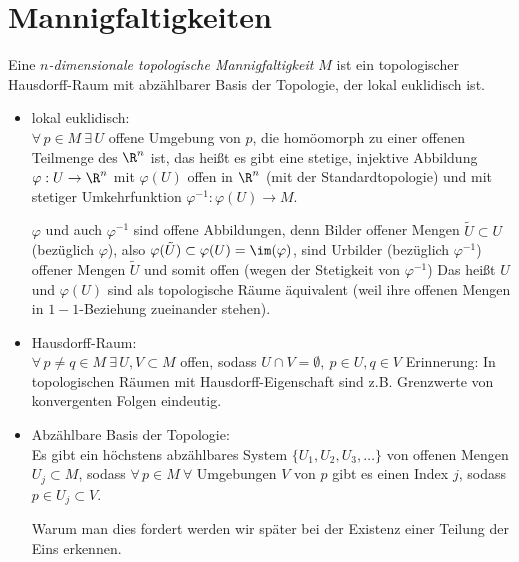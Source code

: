 \chapter{Mannigfaltigkeiten}\lecture

\begin{defn}\label{def1_1}
	Eine \emph{$n$-dimensionale topologische Mannigfaltigkeit $M$} ist ein topologischer Hausdorff-Raum mit abzählbarer Basis der Topologie, der lokal euklidisch ist.
	\begin{itemize}
		\item lokal euklidisch:\\
			$ \forall\, p \in M\ \exists\, U $ offene Umgebung von $p$, die homöomorph zu einer offenen Teilmenge des $\R^n$ ist, das heißt es gibt eine stetige, injektive Abbildung $ \varphi: U \to \R^n $ mit $ \varphi(U) $ offen in $\R^n$ (mit der Standardtopologie) und mit stetiger Umkehrfunktion $\varphi^{-1}: \varphi(U) \to M$.
			\begin{rem*}
				$\varphi$ und auch $\varphi^{-1}$ sind offene Abbildungen, denn Bilder offener Mengen $ \tilde{U} \subset U $ (bezüglich $\varphi$), also $ \varphi(\tilde{U}) \subset \varphi(U) = \im(\varphi) $, sind Urbilder (bezüglich $\varphi^{-1}$) offener Mengen $\tilde{U}$ und somit offen (wegen der Stetigkeit von $\varphi^{-1}$)
				Das heißt $U$ und $\varphi(U)$ sind als topologische Räume äquivalent (weil ihre offenen Mengen in $1-1$-Beziehung zueinander stehen).
			\end{rem*}
		\item Hausdorff-Raum:\\
			$ \forall\, p \neq q \in M \ \exists\, U,V \subset M $ offen, sodass $ U \cap V = \emptyset,\ p \in U, q \in V $
			\image{1_1 hausdorff}{6cm}
			Erinnerung: In topologischen Räumen mit Hausdorff-Eigenschaft sind z.B. Grenzwerte von konvergenten Folgen eindeutig.
		\item Abzählbare Basis der Topologie:\\
			Es gibt ein höchstens abzählbares System $ \{U_1,U_2,U_3,\dots\} $ von offenen Mengen $ U_j \subset M $, sodass $ \forall\, p \in M \ \forall $ Umgebungen $V$ von $p$ gibt es einen Index $j$, sodass $ p \in U_j \subset V $.
			\begin{rem*}
				Warum man dies fordert werden wir später bei der Existenz einer Teilung der Eins erkennen.
			\end{rem*}
	\end{itemize}

\end{defn}
